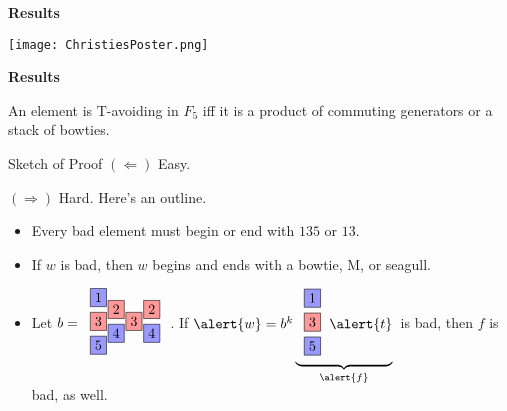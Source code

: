 \documentclass[9pt,handout]{beamer}
\newcommand{\<}{\langle}
\renewcommand{\>}{\rangle}
\begin{document}

\begin{frame}{\textbf{Results}}

\begin{center}
\texttt{[image: ChristiesPoster.png]}
\end{center}

\end{frame}



\begin{frame}{\textbf{Results}}

\begin{theorem}
An element is T-avoiding in $F_{5}$ iff it is a product of commuting generators or a stack of bowties. 
\end{theorem}

\begin{block}{Sketch of Proof}
$(\Leftarrow)$ Easy. 

$(\Rightarrow)$ Hard.  Here's an outline.

\begin{itemize}

\item Every bad element must begin or end with $135$ or $13$.

\item If $w$ is bad, then $w$ begins and ends with a bowtie, M, or seagull.\pause

\item Let $b=\begin{tabular}{c}
\begin{tikzpicture}[scale=.3]
\node[draw, rectangle, fill=blue!40] at (0,5.5){1};
\node[draw, rectangle, fill=red!40] at (0,3.5){3};
\node[draw, rectangle, fill=blue!40] at (0,1.5){5};
\node[draw, rectangle, fill=red!40] at (1.5,4.5){2};
\node[draw, rectangle, fill=blue!40] at (1.5,2.5){4};
\node[draw, rectangle, fill=red!40] at (3,3.5){3};
\node[draw, rectangle, fill=red!40] at (4.5,4.5){2};
\node[draw, rectangle, fill=blue!40] at (4.5,2.5){4};
\end{tikzpicture}
\end{tabular}$.  If $\alert{w}=b^{k}\underbrace{\begin{tabular}{c}
\begin{tikzpicture}[scale=.3]
\node[draw, rectangle, fill=blue!40] at (6,5.5){1};
\node[draw, rectangle, fill=red!40] at (6,3.5){3};
\node[draw, rectangle, fill=blue!40] at (6,1.5){5};
\end{tikzpicture}
\end{tabular}\alert{t}}_{\alert{f}}$\ is bad, then $f$ is bad, as well. \pause


\end{itemize}
\end{block}
\end{frame}
\end{document}
